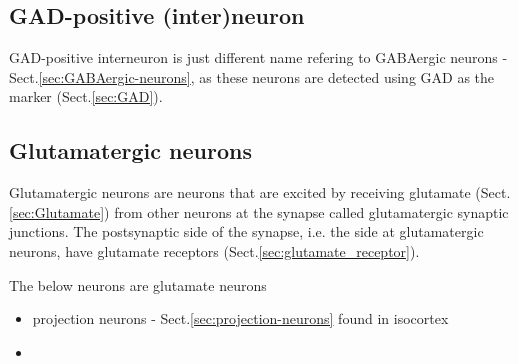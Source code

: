 \subsection{GAD-positive (inter)neuron}
\label{sec:GAD-positive-neuron}

GAD-positive interneuron is just different name refering to
GABAergic neurons - Sect.\ref{sec:GABAergic-neurons}, as these neurons are
detected using GAD as the marker (Sect.\ref{sec:GAD}). 

 




\subsection{Glutamatergic neurons}
\label{sec:glutamatergic_neurons}

Glutamatergic neurons are neurons that are excited by receiving glutamate
(Sect.\ref{sec:Glutamate}) from other neurons at the synapse called
glutamatergic synaptic junctions. The postsynaptic side of the synapse, i.e. the
side at glutamatergic neurons, have glutamate receptors
(Sect.\ref{sec:glutamate_receptor}).

The below neurons are glutamate neurons  
\begin{itemize}
  \item projection neurons - Sect.\ref{sec:projection-neurons} found in
  isocortex
  
  \item 
\end{itemize}

